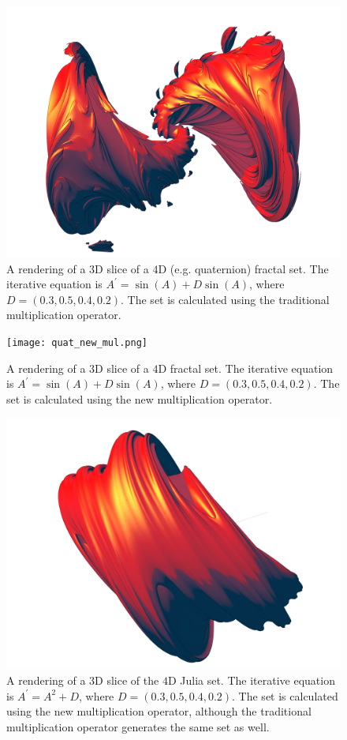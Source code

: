 \documentclass[12pt]{article}
\begin{document}
\pagebreak






\begin{figure} 
\centering
  \includegraphics[width = 6 in]{quat_trad_mul.png}
  \caption{A rendering of a $3$D slice of a $4$D (e.g. quaternion) fractal set.
The iterative equation is $A^{\prime} = \sin(A) + D \sin(A)$, where $D = (0.3, 0.5, 0.4, 0.2)$.
The set is calculated using the traditional multiplication operator.
}
\end{figure}

\begin{figure} 
\centering
  \texttt{[image: quat\_new\_mul.png]}
  \caption{A rendering of a $3$D slice of a $4$D fractal set.
The iterative equation is $A^{\prime} = \sin(A) + D \sin(A)$, where $D = (0.3, 0.5, 0.4, 0.2)$.
The set is calculated using the new multiplication operator.
}
\end{figure}

\begin{figure} 
\centering
  \includegraphics[width = 6 in]{quat_z2_c.png}
  \caption{A rendering of a $3$D slice of the $4$D Julia set.
The iterative equation is $A^{\prime} = A^2 + D$, where $D = (0.3, 0.5, 0.4, 0.2)$.
The set is calculated using the new multiplication operator, although the traditional multiplication operator generates the same set as well.
}
\end{figure}
\end{document}

